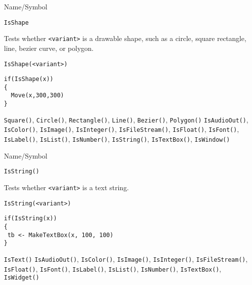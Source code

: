 \begin{desc}{Name/Symbol}
\item[Name/Symbol]	\verb+IsShape+

\item[Description]	Tests whether \verb+<variant>+ is a drawable
  shape, such as a circle, square rectangle, line, bezier curve, or
  polygon.


\item[Usage]		
\begin{verbatim}
IsShape(<variant>)
\end{verbatim}

\item[Example]	
\begin{verbatim}
if(IsShape(x))
{
  Move(x,300,300)
}
\end{verbatim}

\item[See Also]	\verb+Square()+, \verb+Circle()+,
  \verb+Rectangle()+, \verb+Line()+, \verb+Bezier()+, \verb+Polygon()+ 
 \verb+IsAudioOut()+, \verb+IsColor()+,
  \verb+IsImage()+, \verb+IsInteger()+, \verb+IsFileStream()+,
  \verb+IsFloat()+, \verb+IsFont()+, \verb+IsLabel()+,
  \verb+IsList()+, \verb+IsNumber()+, \verb+IsString()+,
  \verb+IsTextBox()+, \verb+IsWindow()+
\end{desc}

\rl


\begin{desc}{Name/Symbol}
\item[Name/Symbol]	\verb+IsString()+

\item[Description]	Tests whether \verb+<variant>+ is a text string.

\item[Usage]		
\begin{verbatim}
IsString(<variant>)
\end{verbatim}

\item[Example]	
\begin{verbatim}
if(IsString(x))
{
 tb <- MakeTextBox(x, 100, 100)
}
\end{verbatim}

\item[See Also] \verb+IsText()+	\verb+IsAudioOut()+, \verb+IsColor()+, \verb+IsImage()+, \verb+IsInteger()+, 
		\verb+IsFileStream()+, \verb+IsFloat()+, \verb+IsFont()+, \verb+IsLabel()+,
		\verb+IsList()+, \verb+IsNumber()+, \verb+IsTextBox()+, \verb+IsWidget()+
\end{desc}

